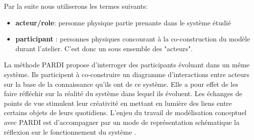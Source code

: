 Par la suite nous utiliserons les termes suivants:
\begin{itemize}
  \item \textbf{acteur/role}: personne physique partie prenante dans le système étudié
  \item \textbf{participant} : personnes physiques concourant à la co-construction du modèle durant l'atelier. C'est donc un sous ensemble des "acteurs".
\end{itemize}

\vspace{0.5cm}

La méthode PARDI propose d'interroger des participants évoluant dans un même système. Ils participent à co-construire un diagramme d'interactions entre acteurs sur la base de la connaissance qu'ils ont de ce système. Elle a pour effet de les faire réfléchir sur la réalité du système dans lequel ils évoluent. Les échanges de points de vue stimulent leur créativité en mettant en lumière des liens entre certains objets de leurs quotidiens. L'enjeu du travail de modélisation conceptuel avec PARDI est d'accompagner par un mode de représentation schématique la réflexion sur le fonctionnement du système \cite{becu_les_2010}.\\


